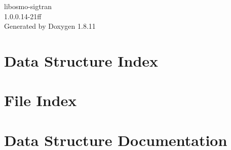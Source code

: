 \documentclass[twoside]{book}
\newcommand{\+}{\discretionary{\mbox{\scriptsize$\hookleftarrow$}}{}{}}
\newcommand{\clearemptydoublepage}{%
  \newpage{\pagestyle{empty}\cleardoublepage}%
}
\begin{document}
\begin{titlepage}
\vspace*{7cm}
\begin{center}%
{\Large libosmo-\/sigtran \\[1ex]\large 1.\+0.\+0.\+14-\/21ff }\\
\vspace*{1cm}
{\large Generated by Doxygen 1.8.11}\\
\end{center}
\end{titlepage}
\clearemptydoublepage
\tableofcontents
\clearemptydoublepage
{}

\chapter{Data Structure Index}

\chapter{File Index}

\chapter{Data Structure Documentation}





















































\end{document}
